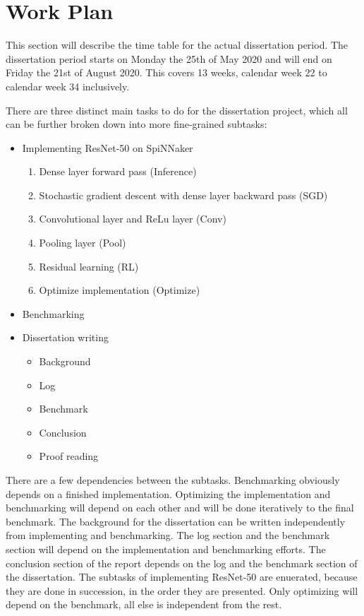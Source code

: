 \documentclass{article}
\begin{document}

\section{Work Plan} %
\label{sec:work_plan}


This section will describe the time table for the actual
dissertation period.
The dissertation period starts on Monday the 25th of May
2020 and will end on Friday the 21st of August 2020.
This covers 13 weeks, calendar week 22 to calendar week 34
inclusively.

There are three distinct main tasks to do for the
dissertation project, which all can be further broken
down into more fine-grained subtasks:
\begin{itemize}
  \item Implementing ResNet-50 on SpiNNaker
    \begin{enumerate}
      \item Dense layer forward pass (Inference)
        \citep[see][]{goodfellow2016}
      \item Stochastic gradient descent with dense layer
        backward pass (SGD) \citep[see][]{goodfellow2016}
      \item Convolutional layer and ReLu layer (Conv)
        \citep[see][]{goodfellow2016}
      \item Pooling layer (Pool)
        \citep[see][]{goodfellow2016}
      \item Residual learning (RL)
        \citep[see][]{he_et_al_2015}
      \item Optimize implementation (Optimize)
    \end{enumerate}
  \item Benchmarking
  \item Dissertation writing
    \begin{itemize}
      \item Background
      \item Log
      \item Benchmark
      \item Conclusion
      \item Proof reading
    \end{itemize}
\end{itemize}
There are a few dependencies between the subtasks.
Benchmarking obviously depends on a finished
implementation.
Optimizing the implementation and benchmarking will depend
on each other and will be done iteratively to the final
benchmark.
The background for the dissertation can be written
independently from implementing and benchmarking.
The log section and the benchmark section will depend on
the implementation and benchmarking efforts.
The conclusion section of the report depends on the log and
the benchmark section of the dissertation.
The subtasks of implementing ResNet-50 are enuerated,
because they are done in succession, in the order they
are presented.
Only optimizing will depend on the benchmark, all else is
independent from the rest.
\end{document}
